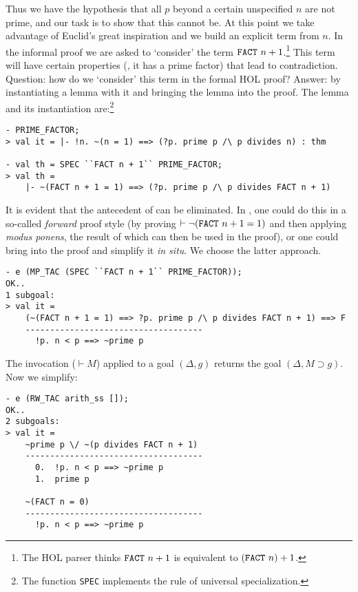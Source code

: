 Thus we have the hypothesis that all $p$ beyond a certain unspecified
$n$ are not prime, and our task is to show that this cannot be. At this
point we take advantage of Euclid's great inspiration and we build an
explicit term from $n$. In the informal proof we are asked to `consider'
the term $\mbox{\tt FACT}\ n + 1$.\footnote{The HOL parser thinks
$\mbox{\tt FACT}\ n + 1$ is equivalent to $(\mbox{\tt FACT}\ n) + 1$.}
This term will have certain properties (\ie, it has a prime factor) that
lead to contradiction. Question: how do we `consider' this term in the
formal HOL proof? Answer: by instantiating a lemma with it and bringing the
lemma into the proof. The lemma and its instantiation are:\footnote{The
function {\tt SPEC} implements the rule of universal specialization.}
\begin{session}
\begin{verbatim}
- PRIME_FACTOR;
> val it = |- !n. ~(n = 1) ==> (?p. prime p /\ p divides n) : thm

- val th = SPEC ``FACT n + 1`` PRIME_FACTOR;
> val th =
    |- ~(FACT n + 1 = 1) ==> (?p. prime p /\ p divides FACT n + 1)
\end{verbatim}
\end{session}
It is evident that the antecedent of  can be eliminated. In
\holn{}, one could do this in a so-called {\it forward\/} proof style (by
proving $\vdash \neg(\mbox{\tt FACT}\ n + 1 = 1)$ and then applying {\it
modus ponens}, the result of which can then be used in the proof), or
one could bring  into the proof and simplify it {\it in
situ}. We choose the latter approach.
\begin{session}
\begin{verbatim}
- e (MP_TAC (SPEC ``FACT n + 1`` PRIME_FACTOR));
OK..
1 subgoal:
> val it =
    (~(FACT n + 1 = 1) ==> ?p. prime p /\ p divides FACT n + 1) ==> F
    ------------------------------------
      !p. n < p ==> ~prime p
\end{verbatim}
\end{session}
    The invocation  ($\vdash M$) applied to a goal
    $(\Delta, g)$ returns the goal $(\Delta, M \supset g)$. Now we
    simplify:
\begin{session}
\begin{verbatim}
- e (RW_TAC arith_ss []);
OK..
2 subgoals:
> val it =
    ~prime p \/ ~(p divides FACT n + 1)
    ------------------------------------
      0.  !p. n < p ==> ~prime p
      1.  prime p

    ~(FACT n = 0)
    ------------------------------------
      !p. n < p ==> ~prime p
\end{verbatim}
\end{session}
